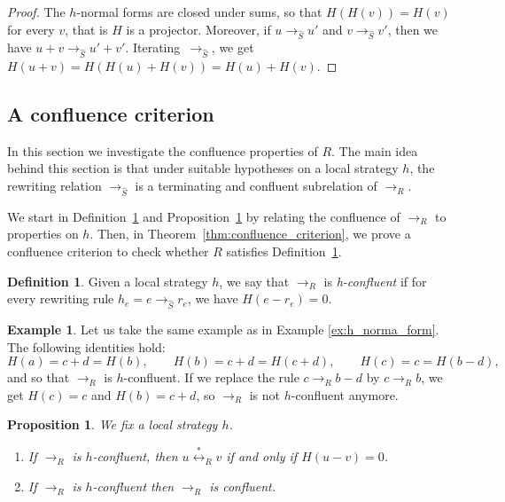 \documentclass[10pt]{easychair}
\newtheorem{proposition}[theorem]{Proposition}
\theoremstyle{definition}
\newtheorem{definition}[theorem]{Definition}
\newtheorem{example}[theorem]{Example}
\newcommand\rewR{\to_R}
\newcommand\rewS{\to_{\hat{S}}}
\newcommand\equivR{\overset{*}{\leftrightarrow}_R}
\begin{document}
\begin{proof}
  The $h$-normal forms are closed under sums, so that $H(H(v))=H(v)$ for
  every $v$, that is $H$ is a projector. Moreover, if $u\rewS u'$ and
  $v\rewS v'$, then we have $u+v\rewS u'+v'$. Iterating~$\rewS$, we get
  $H(u+v)=H(H(u)+H(v))=H(u)+H(v)$. 
\end{proof}

\subsection{A confluence criterion}
\label{sec:a_confluence_criterion}

In this section we investigate the confluence properties of $R$. The main
idea behind this section is that under suitable hypotheses on a local
strategy $h$, the rewriting relation $\rewS$ is a terminating and
confluent subrelation of $\rewR$.
\medskip

We start in Definition~\ref{def:standardisation_property} and 
Proposition~\ref{prop:h_and_R_confluence} by relating the confluence of
$\rewR$ to properties on $h$. Then, in
Theorem~\ref{thm:confluence_criterion}, we prove a confluence criterion
to check whether $R$ satisfies
Definition~\ref{def:standardisation_property}.

\begin{definition}\label{def:standardisation_property}
  Given a local strategy $h$, we say that $\rewR$ is \emph{h-confluent}
  if for every rewriting rule $h_e=e\rewS r_e$, we have $H(e-r_e)=0$.
\end{definition}
\smallskip

\begin{example}
  Let us take the same example as in Example \ref{ex:h_norma_form}. The
  following identities hold:
  \[
  H(a)=c+d=H(b),\qquad H(b)=c+d=H(c+d),\qquad H(c)=c= H(b-d),
  \]
  and so that $\rewR$ is $h$-confluent. If we replace the rule
  $c\rewR b-d$ by $c\rewR b$, we get $H(c)=c$ and $H(b)=c+d$, so $\rewR$
  is not $h$-confluent anymore. 
\end{example}
\smallskip

\begin{proposition}\label{prop:h_and_R_confluence}
  We fix a  local strategy $h$.
  \begin{enumerate}
  \item\label{it:equationnal_theory} If $\rewR$ is $h$-confluent, then
    $u\equivR v$ if and only if $H(u-v)=0$.
  \item\label{it:h-conf_implies_conf} If $\rewR$ is $h$-confluent then
    $\rewR$ is confluent.
  \end{enumerate}
\end{proposition}
\end{document}
